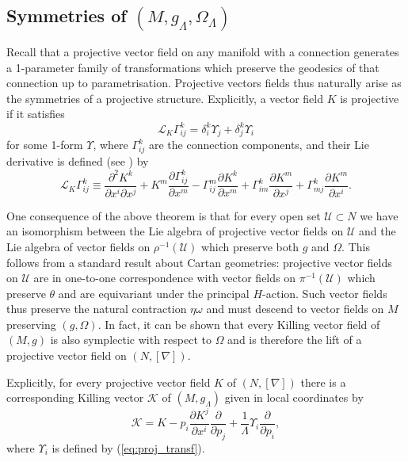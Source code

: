 \subsection{Symmetries of $(M,g_{\Lambda},\Omega_{\Lambda})$}

Recall that a projective vector field on any manifold with a connection
generates a 1-parameter family of transformations which preserve the
geodesics of that connection up to parametrisation. Projective vectors
fields thus naturally arise as the symmetries of a projective structure.
Explicitly, a vector field $K$ is projective if it satisfies
\begin{equation}
\mathcal{L}_{K}\Gamma_{ij}^{k}=\delta_{i}^{k}\Upsilon_{j}+\delta_{j}^{k}\Upsilon_{i}\label{eq:proj_transf}
\end{equation}
for some 1-form $\Upsilon$, where $\Gamma_{ij}^{k}$ are the connection
components, and their Lie derivative is defined (see \cite{Yano1955})
by
\begin{equation}
\mathcal{L}_{K}\Gamma_{ij}^{k}\equiv\frac{\partial^{2}K^{k}}{\partial x^{i}\partial x^{j}}+K^{m}\frac{\partial\Gamma_{ij}^{k}}{\partial x^{m}}-\Gamma_{ij}^{m}\frac{\partial K^{k}}{\partial x^{m}}+\Gamma_{im}^{k}\frac{\partial K^{m}}{\partial x^{j}}+\Gamma_{mj}^{k}\frac{\partial K^{m}}{\partial x^{i}}.\label{eq:liederivGamma}
\end{equation}


One consequence of the above theorem is that for every open set $\mathcal{U}\subset N$
we have an isomorphism between the Lie algebra of projective vector
fields on $\mathcal{U}$ and the Lie algebra of vector fields on $\rho^{-1}(\mathcal{U})$
which preserve both $g$ and $\Omega$. This follows from a standard
result about Cartan geometries: projective vector fields on $\mathcal{U}$
are in one-to-one correspondence with vector fields on $\pi^{-1}(\mathcal{U})$
which preserve $\theta$ and are equivariant under the principal $H$-action.
Such vector fields thus preserve the natural contraction $\eta\omega$
and must descend to vector fields on $M$ preserving $(g,\Omega)$.
In fact, it can be shown that every Killing vector field of $(M,g)$
is also symplectic with respect to $\Omega$ and is therefore the
lift of a projective vector field on $(N,[\nabla])$.

Explicitly, for every projective vector field $K$ of $(N,[\nabla])$
there is a corresponding Killing vector $\mathcal{K}$ of $(M,g_{\Lambda})$
given in local coordinates by 
\begin{equation}
\mathcal{K}=K-p_{i}\frac{\partial K^{j}}{\partial x^{i}}\frac{\partial}{\partial p_{j}}+\frac{1}{\Lambda}\Upsilon_{i}\frac{\partial}{\partial p_{i}},\label{eq:kvf_from_pvf}
\end{equation}
where $\Upsilon_{i}$ is defined by (\ref{eq:proj_transf}).

